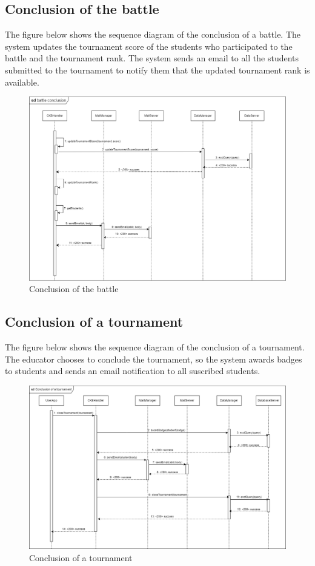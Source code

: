 \subsection{Conclusion of the battle}
The figure below shows the sequence diagram of the conclusion of a battle. The system updates the tournament
score of the students who participated to the battle and the tournament rank. The system sends an email to all the students submitted
to the tournament to notify them that the updated tournament rank is available.
\begin{figure}[H]
    \centering
    \includegraphics[width=1\textwidth]{images/seq_diagrams/battle_conclusion_DD.png}
    \caption{Conclusion of the battle}
\end{figure}

\subsection{Conclusion of a tournament}
The figure below shows the sequence diagram of the conclusion of a tournament. The educator chooses to conclude the tournament, so the system 
awards badges to students and sends an email notification to all suscribed students.
\begin{figure}[H]
    \centering
    \includegraphics[width=1\textwidth]{images/seq_diagrams/tournament_conclusion_DD.png}
    \caption{Conclusion of a tournament}
\end{figure}

